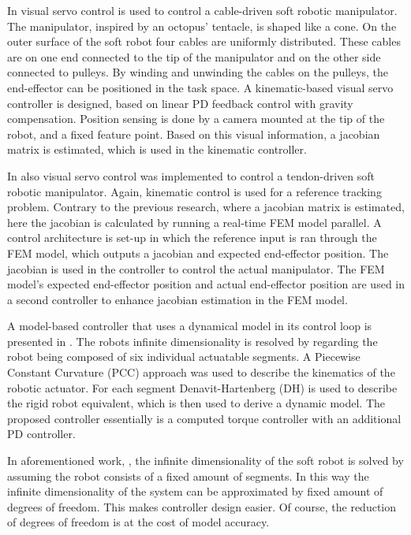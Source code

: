 In \cite{wang2013visual} visual servo control is used to control a cable-driven soft robotic manipulator. The manipulator, inspired by an octopus' tentacle, is shaped like a cone. On the outer surface of the soft robot four cables are uniformly distributed. These cables are on one end connected to the tip of the manipulator and on the other side connected to pulleys. By winding and unwinding the cables on the pulleys, the end-effector can be positioned in the task space. A kinematic-based visual servo controller is designed, based on linear PD feedback control with gravity compensation. Position sensing is done by a camera mounted at the tip of the robot, and a fixed feature point. Based on this visual information, a jacobian matrix is estimated, which is used in the kinematic controller.

In \cite{zhang2017visual} also visual servo control was implemented to control a tendon-driven soft robotic manipulator. Again, kinematic control is used for a reference tracking problem. Contrary to the previous research, where a jacobian matrix is estimated, here the jacobian is calculated by running a real-time FEM model parallel. A control architecture is set-up in which the reference input is ran through the FEM model, which outputs a jacobian and expected end-effector position. The jacobian is used in the controller to control the actual manipulator. The FEM model's expected end-effector position and actual end-effector position are used in a second controller to enhance jacobian estimation in the FEM model.

A model-based controller that uses a dynamical model in its control loop is presented in \cite{della2020model}. The robots infinite dimensionality is resolved by regarding the robot being composed of six individual actuatable segments. A Piecewise Constant Curvature (PCC) approach was used to describe the kinematics of the robotic actuator. For each segment Denavit-Hartenberg (DH) is used to describe the rigid robot equivalent, which is then used to derive a dynamic model. The proposed controller essentially is a computed torque controller with an additional PD controller. 

In aforementioned work, \cite{della2020model}, the infinite dimensionality of the soft robot is solved by assuming the robot consists of a fixed amount of segments. In this way the infinite dimensionality of the system can be approximated by fixed amount of degrees of freedom. This makes controller design easier. Of course, the reduction of degrees of freedom is at the cost of model accuracy. 




